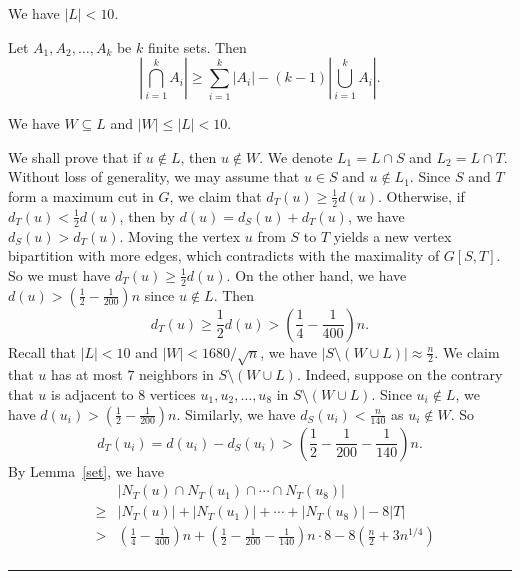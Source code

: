 \documentclass[10pt,a4paper]{amsart}
\newenvironment{proof}{\noindent {\bf Proof.}}{\rule{2mm}{2mm}\par\medskip}
\begin{document}
\begin{lemma}\label{Lupper}  
We have 
$|L| < 10.$ 
\end{lemma}

\begin{lemma}\label{set}
Let $A_1, A_2,\dots, A_k$ be $k$  finite sets. Then
\begin{equation*}\label{set1}
\left|\bigcap_{i=1}^k A_i \right| \ge \sum_{i=1}^k |A_i|-(k-1)\left|\bigcup_{i=1}^k A_i\right|.
\end{equation*}
\end{lemma}

  \begin{lemma} \label{lem-W-sub-L}
  We have $W \subseteq L$ and $|W| \le |L| < 10$. 
  \end{lemma}

  \begin{proof}
We shall prove that if $u\notin L$, then $u\notin W$. 
We denote $L_1=L\cap S$ and $L_2=L\cap T$. Without loss of generality, we may assume that $u\in S$ and 
   $u\notin L_1.$ Since  $S$ and $T$ form a maximum cut in $G$, 
   we claim that $d_T(u)\ge \frac{1}{2}d(u)$. 
   Otherwise, if $d_T(u)< \frac{1}{2}d(u)$, then 
   by $d(u)=d_S(u) + d_T(u)$, we have 
   $d_S(u) > d_T(u)$. Moving the vertex $u$ from 
   $S$ to $T$ yields a new vertex bipartition with more edges, 
   which contradicts with the maximality of $G[S,T]$. 
   So we must have $d_T(u)\ge \frac{1}{2}d(u)$. 
  On the other hand, 
  we have $d(u)> \left(\frac{1}{2}-\frac{1}{200} \right)n$ 
  since $u\not\in L$. Then 
   $$d_T(u)\ge \frac{1}{2}d(u)> 
   \left(\frac{1}{4}-\frac{1}{400} \right)n.$$
  Recall that 
  $|L|< 10$ and $|W| < 1680/ \sqrt{n}$, 
we have 
$  |S\setminus (W\cup L)| \approx \frac{n}{2}$. 
  We claim that $u$ has at most $7$ neighbors in 
  $S\setminus (W\cup L)$. 
  Indeed, suppose on the contrary that 
   $u$ is adjacent to $8$ vertices  $u_1, u_2,\ldots, u_8$ in $S\setminus (W\cup L)$.  Since $u_i\not\in L$,  we have $d(u_i)> \left(\frac{1}{2}-\frac{1}{200}\right )n$. Similarly, 
   we have $d_S(u_i)< \frac{n}{140}$ as $u_i\notin W$. So
  \[  d_T(u_i)=d(u_i)-d_S(u_i)> \left(\frac{1}{2}-\frac{1}{200} - \frac{1}{140} \right)n. \] 
   By Lemma~\ref{set}, we have
   \begin{eqnarray*}
&& \left|N_T(u)\cap N_T(u_1) \cap \cdots 
\cap N_T(u_8) \right|\\[2mm]
 &\ge&  |N_T(u)|+ |N_T(u_1)| + \cdots + |N_T(u_8)|  -8|T| \\
& > &\left (\frac{1}{4}-\frac{1}{400}\right)n+\left(\frac{1}{2}-\frac{1}{200} -\frac{1}{140} \right)n\cdot 8 - 8 \left( \frac{n}{2} + 3n^{1/4}\right)\\

\end{eqnarray*}
\end{proof}
\end{document}
